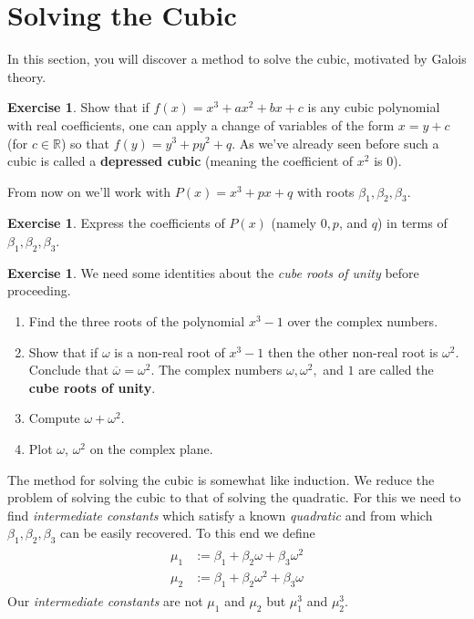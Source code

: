 \documentclass[reqno, 12pt, letter]{article}
\theoremstyle{plain}
\theoremstyle{definition}
\newtheorem{exercise}[theorem]{Exercise}
\theoremstyle{remark}
\numberwithin{equation}{section}
\newcommand\br{{\mathbb R}}
\begin{document}
\newpage
\section{Solving the Cubic}
	In this section, you will discover a method to solve the cubic, motivated by Galois theory.
	
	\begin{exercise}
		\label{exercise:}
		Show that if $f(x) = x^3 + ax^2 +bx +c$ is any cubic polynomial with real coefficients, one can apply
		a change of variables of the form $x = y + c$ (for $c \in \br$)
		so that $f(y) = y^3 + py^2 + q$.
		As we've already seen before such a cubic is called a {\bf depressed cubic} (meaning the coefficient of $x^2$ is $0$).
	\end{exercise}

	From now on we'll work with $P(x) = x^3 + px + q$ with roots $ \beta_1, \beta_2, \beta_3$.
	
	\begin{exercise}
	\label{exercise:coefficients_depressed_cubic}
	Express the coefficients of $P(x)$ (namely $ 0,p$, and $q$) in terms of $ \beta_1, \beta_2, \beta_3$.
	\end{exercise}

	\begin{exercise}
	\label{exercise:cube_roots_of_unity}
	We need some identities about the \emph{cube roots of unity} before proceeding.
	\begin{enumerate}
		\item Find the three roots of the polynomial $ x^3 - 1$ over the complex numbers.
		\item Show that if $ \omega $ is a non-real root of $x^3 -1$ then the other non-real root is $ \omega^2$. Conclude that $ \overline{\omega} = \omega^2$.
			The complex numbers $\omega, \omega^2,$ and $1$ are called the \textbf{cube roots of unity}.
    \item Compute $ \omega + \omega^2$.
		\item Plot $ \omega$, $\omega^2$ on the complex plane.
	\end{enumerate}
\end{exercise}
  The method for solving the cubic is somewhat like induction. We reduce the problem of solving the cubic to that of solving the quadratic. For this we need to find \emph{intermediate constants} which satisfy a known \emph{quadratic} and from which $\beta_1,\beta_2,\beta_3$ can be easily recovered. To this end we define
	\begin{align}
		\label{equation:intermediate_variables_cubic}
		\begin{split}
    \mu_1 &:= \beta_1 + \beta_2 \omega + \beta_3 \omega^2 \\
    \mu_2 &:= \beta_1 + \beta_2 \omega^2 + \beta_3 \omega
	\end{split}
  \end{align} 
	Our \emph{intermediate constants} are not $ \mu_1$ and $ \mu_2$ but $ \mu_1^3$ and $ \mu_2^3$.
\end{document}
